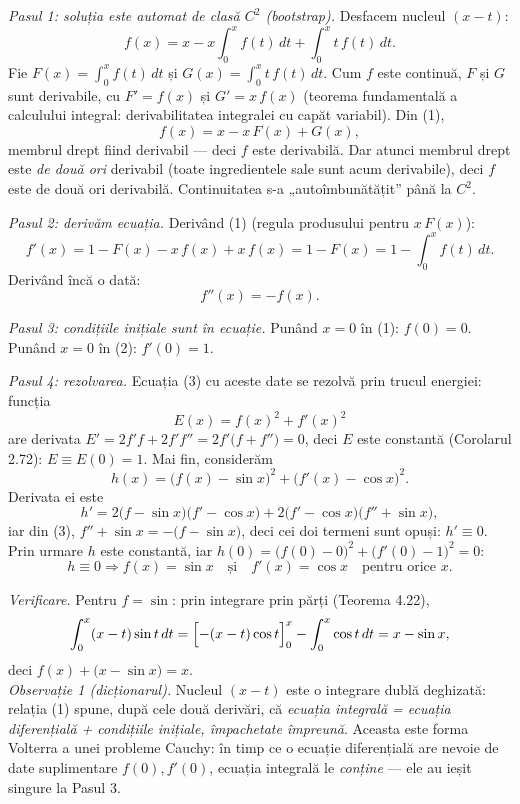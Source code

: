 \emph{Pasul 1: soluția este automat de clasă $C^{2}$ (bootstrap).} Desfacem nucleul $(x-t)$:
\[ f(x)=x-x\int_{0}^{x}f(t)\,dt+\int_{0}^{x}t\,f(t)\,dt . \tag{1} \]
Fie $F(x)=\displaystyle\int_{0}^{x}f(t)\,dt$ și $G(x)=\displaystyle\int_{0}^{x}t\,f(t)\,dt$. Cum $f$ este continuă, $F$ și $G$ sunt derivabile, cu $F'=f(x)$ și $G'=x\,f(x)$ (teorema fundamentală a calculului integral: derivabilitatea integralei cu capăt variabil). Din (1),
\[ f(x)=x-x\,F(x)+G(x) , \]
membrul drept fiind derivabil --- deci $f$ este derivabilă. Dar atunci membrul drept este \emph{de două ori} derivabil (toate ingredientele sale sunt acum derivabile), deci $f$ este de două ori derivabilă. Continuitatea s-a „autoîmbunătățit'' până la $C^{2}$.

\emph{Pasul 2: derivăm ecuația.} Derivând (1) (regula produsului pentru $x\,F(x)$):
\[ f'(x)=1-F(x)-x\,f(x)+x\,f(x)=1-F(x)=1-\int_{0}^{x}f(t)\,dt . \tag{2} \]
Derivând încă o dată:
\[ f''(x)=-f(x) . \tag{3} \]

\emph{Pasul 3: condițiile inițiale sunt în ecuație.} Punând $x=0$ în (1): $f(0)=0$. Punând $x=0$ în (2): $f'(0)=1$.

\emph{Pasul 4: rezolvarea.} Ecuația (3) cu aceste date se rezolvă prin trucul energiei: funcția
\[ E(x)=f(x)^{2}+f'(x)^{2} \]
are derivata $E'=2f'f+2f'f''=2f'\bigl(f+f''\bigr)=0$, deci $E$ este constantă (Corolarul 2.72): $E\equiv E(0)=1$. Mai fin, considerăm
\[ h(x)=\bigl(f(x)-\sin x\bigr)^{2}+\bigl(f'(x)-\cos x\bigr)^{2} . \]
Derivata ei este
\[ h'=2\bigl(f-\sin x\bigr)\bigl(f'-\cos x\bigr)+2\bigl(f'-\cos x\bigr)\bigl(f''+\sin x\bigr) , \]
iar din (3), $f''+\sin x=-\bigl(f-\sin x\bigr)$, deci cei doi termeni sunt opuși: $h'\equiv0$. Prin urmare $h$ este constantă, iar $h(0)=\bigl(f(0)-0\bigr)^{2}+\bigl(f'(0)-1\bigr)^{2}=0$:
\[ h\equiv0 \Longrightarrow f(x)=\sin x\quad\text{și}\quad f'(x)=\cos x\quad\text{pentru orice }x . \]

\emph{Verificare.} Pentru $f=\sin$: prin integrare prin părți (Teorema 4.22),
\[ \int_{0}^{x}(x-t)\sin t\,dt=\Bigl[-(x-t)\cos t\Bigr]_{0}^{x}-\int_{0}^{x}\cos t\,dt=x-\sin x , \]
deci $f(x)+\bigl(x-\sin x\bigr)=x$. \checkmark\\[2pt]
\emph{Observație 1 (dicționarul).} Nucleul $(x-t)$ este o integrare dublă deghizată: relația (1) spune, după cele două derivări, că \emph{ecuația integrală = ecuația diferențială + condițiile inițiale, împachetate împreună}. Aceasta este forma Volterra a unei probleme Cauchy: în timp ce o ecuație diferențială are nevoie de date suplimentare $f(0),f'(0)$, ecuația integrală le \emph{conține} --- ele au ieșit singure la Pasul 3.


